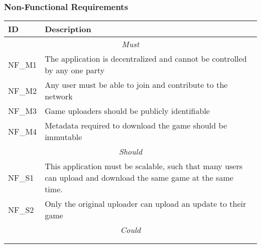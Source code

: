 \subsubsection*{Non-Functional Requirements}

\begin{longtable}{ p{} p{} }
  \toprule
  \textbf{ID} & \textbf{Description}
  \\\midrule\midrule
  \multicolumn{2}{c}{\cellcolor{red!70}\textit{Must}}\\\midrule
  NF\_M1 & The application is decentralized and cannot be controlled by any one party\\
  NF\_M2 & Any user must be able to join and contribute to the network\\
  NF\_M3 & Game uploaders should be publicly identifiable\\
  NF\_M4 & Metadata required to download the game should be immutable\\
  \midrule\multicolumn{2}{c}{\cellcolor{orange!70}\textit{Should}}\\\midrule
  NF\_S1 & This application must be scalable, such that many users can upload and download the same game at the same time.\\
  NF\_S2 & Only the original uploader can upload an update to their game\\
  \midrule\multicolumn{2}{c}{\cellcolor{green}\textit{Could}}\\\midrule
  \\
  \midrule
  \bottomrule
  \label{tab:non-functional-requirements}
\end{longtable}